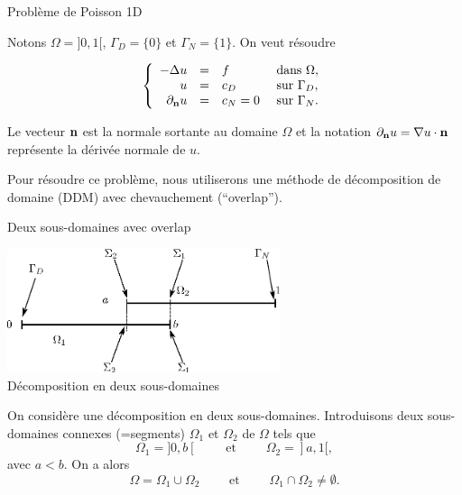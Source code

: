 \documentclass[
mode=present,    %
paper=a4paper,   %
orient=landscape,
display=slides,   %
size=10pt,
style=romain   %
]{powerdot}
\begin{document}
\begin{slide}[toc=]{Problème de Poisson 1D}

\bigskip

Notons $\Omega = ]0,1[$, $\Gamma_{D} = \{0\}$ et $\Gamma_{N}= \{1\}$. On
veut résoudre

\begin{equation}
\left\{\begin{array}{r c l l}
-\Delta u &=& f &\text{ dans } \Omega,\\
u &=& c_{D} & \text{ sur }\Gamma_{D},\\
\partial_{\mathbf{n}} u &=& c_{N} = 0 & \text{ sur }\Gamma_{N}.
\end{array}\right.
\end{equation}

\bigskip

Le vecteur $\mathbf{n}$ est la normale sortante au domaine $\Omega$ et la notation
$\partial_{\mathbf{n}} u = \nabla u \cdot \mathbf{n}$ représente la dérivée normale de $u$. 

\bigskip
Pour résoudre ce problème, nous utiliserons une méthode de décomposition de
domaine (DDM) avec chevauchement (``overlap'').

\end{slide}

\begin{slide}[toc=Deux sous-domaines]{Deux sous-domaines avec overlap}

\begin{center}
 \includegraphics[width=0.6\textwidth]{2dom.eps}\\[1em]
 Décomposition en deux sous-domaines
\end{center}

On considère une décomposition en deux sous-domaines. 
Introduisons deux sous-domaines connexes (=segments) $\Omega_{1}$ et
$\Omega_{2}$ de $\Omega$ tels que
$$
\Omega_{1} = ]0, b[\qquad\text{ et }\qquad\Omega_{2} = ]a, 1[,
$$
avec $a < b$. On a alors
$$
\Omega = \Omega_{1}\cup\Omega_{2}\qquad\text{ et }\qquad \Omega_{1}\cap\Omega_{2} \neq\emptyset.
$$

\end{slide}
\end{document}
